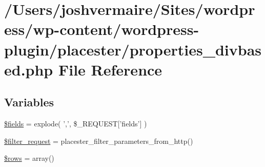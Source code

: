 \hypertarget{properties__divbased_8php}{
\section{/Users/joshvermaire/Sites/wordpress/wp-\/content/wordpress-\/plugin/placester/properties\_\-divbased.php File Reference}
\label{d4/d59/properties__divbased_8php}
}
\subsection*{Variables}
\begin{DoxyCompactItemize}
\item 
\hyperlink{properties__divbased_8php_ab2303c817e3b402b77b7f99627b9c319}{\$fields} = explode( ',', \$\_\-REQUEST\mbox{[}'fields'\mbox{]} )
\item 
\hyperlink{properties__divbased_8php_a867e2cebab27257f0c333daace141858}{\$filter\_\-request} = placester\_\-filter\_\-parameters\_\-from\_\-http()
\item 
\hyperlink{properties__divbased_8php_ace2ec39e7df3899fa8df9640ec274b03}{\$rows} = array()
\end{DoxyCompactItemize}


